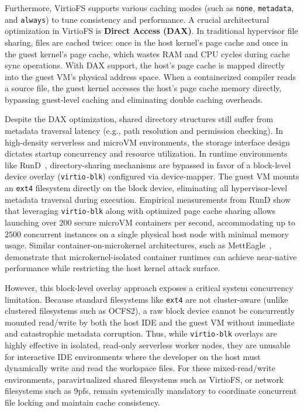 Furthermore, VirtioFS supports various caching modes (such as \texttt{none}, \texttt{metadata}, and \texttt{always}) to tune consistency and performance. A crucial architectural optimization in VirtioFS is \textbf{Direct Access (DAX)}. In traditional hypervisor file sharing, files are cached twice: once in the host kernel's page cache and once in the guest kernel's page cache, which wastes RAM and CPU cycles during cache sync operations. With DAX support, the host's page cache is mapped directly into the guest VM's physical address space. When a containerized compiler reads a source file, the guest kernel accesses the host's page cache memory directly, bypassing guest-level caching and eliminating double caching overheads.

Despite the DAX optimization, shared directory structures still suffer from metadata traversal latency (e.g., path resolution and permission checking). In high-density serverless and microVM environments, the storage interface design dictates startup concurrency and resource utilization. In runtime environments like RunD~\cite{Li2022RunD}, directory-sharing mechanisms are bypassed in favor of a block-level device overlay (\texttt{virtio-blk}) configured via device-mapper. The guest VM mounts an \texttt{ext4} filesystem directly on the block device, eliminating all hypervisor-level metadata traversal during execution. Empirical measurements from RunD show that leveraging \texttt{virtio-blk} along with optimized page cache sharing allows launching over $200$ secure microVM containers per second, accommodating up to $2500$ concurrent instances on a single physical host node with minimal memory usage. Similar container-on-microkernel architectures, such as MettEagle~\cite{Miemietz2025MettEagle}, demonstrate that microkernel-isolated container runtimes can achieve near-native performance while restricting the host kernel attack surface.

However, this block-level overlay approach exposes a critical system concurrency limitation. Because standard filesystems like \texttt{ext4} are not cluster-aware (unlike clustered filesystems such as OCFS2), a raw block device cannot be concurrently mounted read/write by both the host IDE and the guest VM without immediate and catastrophic metadata corruption. Thus, while \texttt{virtio-blk} overlays are highly effective in isolated, read-only serverless worker nodes, they are unusable for interactive IDE environments where the developer on the host must dynamically write and read the workspace files. For these mixed-read/write environments, paravirtualized shared filesystems such as VirtioFS, or network filesystems such as 9pfs, remain systemically mandatory to coordinate concurrent file locking and maintain cache consistency.

